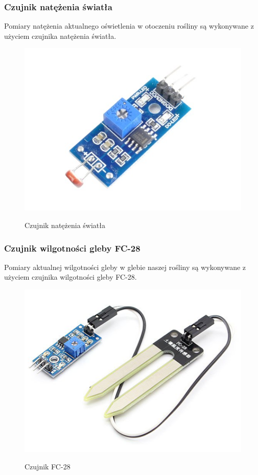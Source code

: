 \documentclass[12pt]{article}
\begin{document}
\subsubsection{Czujnik natężenia światła}
Pomiary natężenia aktualnego oświetlenia w otoczeniu rośliny są wykonywane z użyciem czujnika natężenia światła. 
\begin{figure}[!h]
	\begin{center}
		{\includegraphics[width=12cm]{light_sensor_photo.png}}
	\end{center}
	\caption{Czujnik natężenia światła}
\end{figure}
\subsubsection{Czujnik wilgotności gleby FC-28}
Pomiary aktualnej wilgotności gleby w glebie naszej rośliny są wykonywane z użyciem czujnika wilgotności gleby FC-28.

\begin{figure}[!h]
	\begin{center}
		{\includegraphics[width=12cm]{FC-28_photo.png}}
	\end{center}
	\caption{Czujnik FC-28}
\end{figure}
\end{document}
